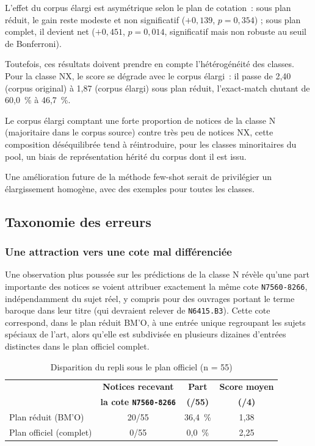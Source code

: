 L'effet du corpus élargi est asymétrique selon le plan de cotation~: sous plan réduit, le gain reste modeste et non significatif ($+0{,}139$, $p=0{,}354$) ; sous plan complet, il devient net ($+0{,}451$, $p=0{,}014$, significatif mais non robuste au seuil de Bonferroni).

Toutefois, ces résultats doivent prendre en compte l'hétérogénéité des classes. Pour la classe NX, le score se dégrade avec le corpus élargi~: il passe de 2,40 (corpus original) à 1,87 (corpus élargi) sous plan réduit, l'exact-match chutant de 60,0~\% à 46,7~\%.

Le corpus élargi comptant une forte proportion de notices de la classe N (majoritaire dans le corpus source) contre très peu de notices NX, cette composition déséquilibrée tend à réintroduire, pour les classes minoritaires du pool, un biais de représentation hérité du corpus dont il est issu.

Une amélioration future de la méthode few-shot serait de privilégier un élargissement homogène, avec des exemples pour toutes les classes.

\subsection{Taxonomie des erreurs}
\label{sec:taxonomie-erreurs}

\subsubsection*{Une attraction vers une cote mal différenciée}

Une observation plus poussée sur les prédictions de la classe N révèle qu'une part importante des notices se voient attribuer exactement la même cote \texttt{N7560-8266}, indépendamment du sujet réel, y compris pour des ouvrages portant le terme baroque  dans leur titre (qui devraient relever de \texttt{N6415.B3}). Cette cote correspond, dans le plan réduit BM'O, à une entrée unique regroupant les sujets spéciaux de l'art, alors qu'elle est subdivisée en plusieurs dizaines d'entrées distinctes dans le plan officiel complet.

\begin{table}[h]
\centering
\begin{tabular}{lccc}
\toprule
& \textbf{Notices recevant} & \textbf{Part} & \textbf{Score moyen} \\
& \textbf{la cote \texttt{N7560-8266}} & \textbf{(/55)} & \textbf{(/4)} \\
\midrule
Plan réduit (BM'O)      & 20/55 & 36,4~\% & 1,38 \\
Plan officiel (complet) & 0/55  & 0,0~\%  & 2,25 \\
\bottomrule
\end{tabular}
\caption{Disparition du repli sous le plan officiel (n = 55)}
\label{tab:attraction-plan-reduit-officiel}
\end{table}

